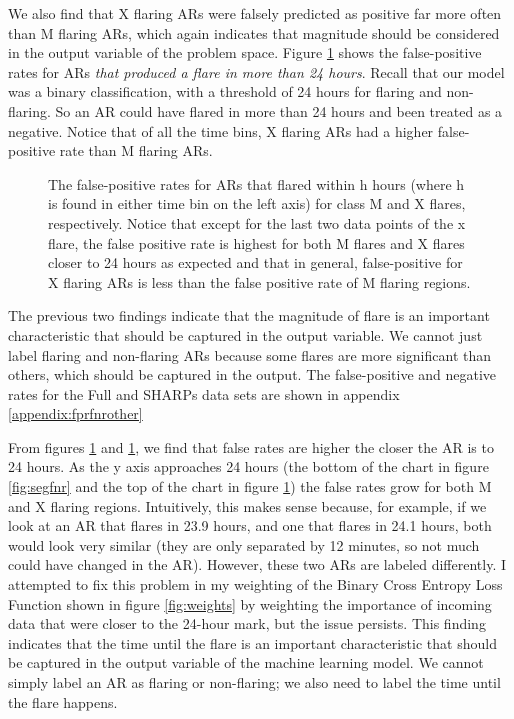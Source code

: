 We also find that X flaring ARs were falsely predicted as positive far more often than M flaring ARs, which again indicates that magnitude should be considered in the output variable of the problem space. Figure \ref{fig:segfpr} shows the false-positive rates for ARs \textit{that produced a flare in more than 24 hours}. Recall that our model was a binary classification, with a threshold of 24 hours for flaring and non-flaring. So an AR could have flared in more than 24 hours and been treated as a negative. Notice that of all the time bins, X flaring ARs had a higher false-positive rate than M flaring ARs. 
\begin{figure}[h]
    \centering
    \caption{The false-positive rates for ARs that flared within h hours (where h is found in either time bin on the left axis) for class M and X flares, respectively. Notice that except for the last two data points of the x flare, the false positive rate is highest for both M flares and X flares closer to 24 hours as expected and that in general, false-positive for X flaring ARs is less than the false positive rate of M flaring regions.}
    \label{fig:segfpr}
\end{figure}

The previous two findings indicate that the magnitude of flare is an important characteristic that should be captured in the output variable. We cannot just label flaring and non-flaring ARs because some flares are more significant than others, which should be captured in the output. The false-positive and negative rates for the Full and SHARPs data sets are shown in appendix \ref{appendix:fprfnrother}

From figures \ref{fig:segfpr} and \ref{fig:segfpr}, we find that false rates are higher the closer the AR is to 24 hours. As the y axis approaches 24 hours (the bottom of the chart in figure \ref{fig:segfnr} and the top of the chart in figure \ref{fig:segfpr}) the false rates grow for both M and X flaring regions. Intuitively, this makes sense because, for example, if we look at an AR that flares in 23.9 hours, and one that flares in 24.1 hours, both would look very similar (they are only separated by 12 minutes, so not much could have changed in the AR). However, these two ARs are labeled differently. I attempted to fix this problem in my weighting of the Binary Cross Entropy Loss Function shown in figure \ref{fig:weights} by weighting the importance of incoming data that were closer to the 24-hour mark, but the issue persists. This finding indicates that the time until the flare is an important characteristic that should be captured in the output variable of the machine learning model. We cannot simply label an AR as flaring or non-flaring; we also need to label the time until the flare happens.

